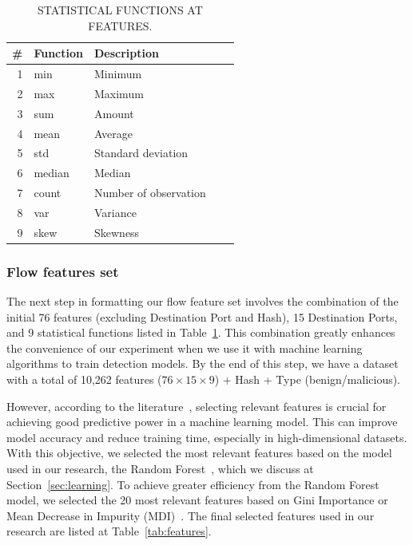 \begin{table}[ht]
  \caption{STATISTICAL FUNCTIONS AT FEATURES.}
  \centering
  \begin{small}
    \begin{tabular}{rllrr}   \hline
 \# & Function & Description\\ \hline

1 &  min &  Minimum\\ 
  2 &  max & Maximum\\ 
  3 &  sum & Amount\\ 
  4 &  mean & Average\\ 
  5 &  std & Standard deviation \\ 
  6 &  median & Median\\ 
  7 &  count & Number of observation\\ 
  8 &  var & Variance\\ 
  9 &  skew & Skewness \\ 
   \hline

 \end{tabular}
 \end{small}
 \label{tab:function}
 \end{table}


\subsubsection{Flow features set}\label{sec:set}

The next step in formatting our flow feature set involves the combination of the initial 76 features (excluding Destination Port and Hash), 15 Destination Ports, and 9 statistical functions listed in Table~\ref{tab:function}. This combination greatly enhances the convenience of our experiment when we use it with machine learning algorithms to train detection models. By the end of this step, we have a dataset with a total of 10,262 features ($76\times15\times9$) + Hash + Type (benign/malicious).

However, according to the literature~\cite{DBLP:conf/ichmi/Xie22,DBLP:journals/mta/AmiriebrahimabadiM24}, selecting relevant features is crucial for achieving good predictive power in a machine learning model. This can improve model accuracy and reduce training time, especially in high-dimensional datasets. With this objective, we selected the most relevant features based on the model used in our research, the Random Forest~\cite{james2023introduction}, which we discuss at Section~\ref{sec:learning}. To achieve greater efficiency from the Random Forest model, we selected the 20 most relevant features based on Gini Importance or Mean Decrease in Impurity (MDI)~\cite{james2023introduction}. The final selected features used in our research are listed at Table~\ref{tab:features}.

